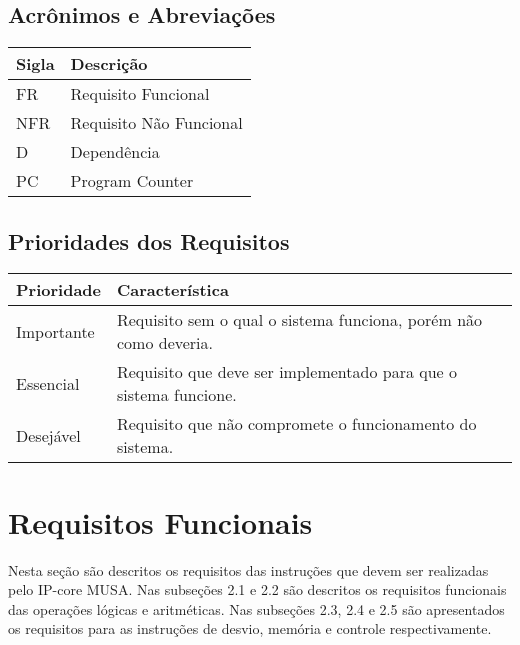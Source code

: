 \documentclass{article}
\begin{document}
	\subsection{Acrônimos e Abreviações}
	\begin{table}[H]
		\begin{center}
			\begin{tabular}[pos]{|m{2cm} | m{12cm}|} \hline
			\cellcolor[gray]{0.9}\textbf{Sigla} & \cellcolor[gray]{0.9}\textbf{Descrição} \\ \hline
		          FR      & Requisito Funcional  \\ \hline
		          NFR     & Requisito Não Funcional  \\ \hline
		          D       & Dependência  \\ \hline
				  PC      & Program Counter \\ \hline 
			\end{tabular}
		\end{center}
	\end{table}  
		
	\subsection{Prioridades dos Requisitos}

	\begin{table}[H]
		\begin{center}
			\begin{tabular}[pos]{|m{2cm} | m{12cm}|} \hline
			\cellcolor[gray]{0.9}\textbf{Prioridade} & \cellcolor[gray]{0.9}\textbf{Característica} \\ \hline
			Importante      & Requisito sem o qual o sistema funciona, porém não como deveria.  \\ \hline
			Essencial       & Requisito que deve ser implementado para que o sistema funcione.  \\ \hline
			Desejável       & Requisito que não compromete o funcionamento do sistema.  \\ \hline
			\end{tabular}
		\end{center}
	\end{table}  
		
\section{Requisitos Funcionais}
		Nesta seção são descritos os requisitos das instruções que devem ser realizadas pelo IP-core MUSA. 
		Nas subseções 2.1 e 2.2 são descritos os requisitos funcionais das operações lógicas e aritméticas.
		Nas subseções 2.3, 2.4 e 2.5 são apresentados os requisitos para as instruções de desvio, memória e 
		controle respectivamente. 
	
	
	
	
	
			  
\end{document}
